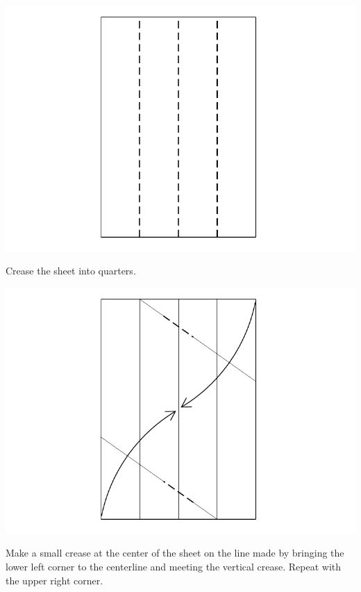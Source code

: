 \documentclass[11pt]{article}
\begin{document}
\begin{minipage}[t]{0.45\textwidth}
  \includegraphics[width=\textwidth]{../figs/fig1}
  \begin{itemize}{\item[1.] Crease the sheet into quarters.}\end{itemize}
\end{minipage}
\hfill
\begin{minipage}[t]{0.45\textwidth}
  \includegraphics[width=\textwidth]{../figs/fig2}
  \begin{itemize}{\item[2.] Make a small crease at the center of the sheet on the line made by bringing the lower left corner to the centerline and meeting the  vertical crease. Repeat with the upper right corner.}\end{itemize}
\end{minipage}
\end{document}
